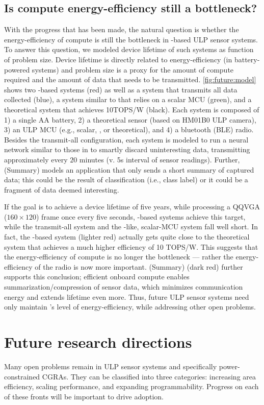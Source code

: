 \subsection{Is compute energy-efficiency still a bottleneck?}
With the progress that has been made, the natural question is whether the energy-efficiency of compute is still the bottleneck in \riptide-based ULP sensor systems.
% 
To answer this question, we modeled device lifetime of such systems as function of problem size.
%
Device lifetime is directly related to energy-efficiency (in battery-powered systems) and problem size is a proxy for the amount of compute required and the amount of data that needs to be transmitted.
% 
\autoref{fig:future:model} shows two \riptide-based systems (red) as well as a system that transmits all data collected (blue), a system similar to \sonic that relies on a scalar MCU (green), and a theoretical system that achieves 10TOPS/W (black).
% 
Each system is composed of 1) a single AA battery, 2) a theoretical sensor (based on HM01B0 ULP camera), 3) an ULP MCU (e.g., scalar, \riptide, or theoretical), and 4) a bluetooth (BLE) radio.
% 
Besides the transmit-all configuration, each system is modeled to run a neural network similar to those in \sonic to smartly discard uninteresting data, transmitting approximately every $20$ minutes (v. 5s interval of sensor readings).
% 
Further, \riptide (Summary) models an application that only sends a short summary of captured data; this could be the result of classification (i.e., class label) or it could be a fragment of data deemed interesting.

If the goal is to achieve a device lifetime of five years, while processing a QQVGA ($160\times120$) frame once every five seconds, \riptide-based systems achieve this target, while the transmit-all system and the \sonic-like, scalar-MCU system fall well short.
% 
In fact, the \riptide-based system (lighter red) actually gets quite close to the theoretical system that achieves a much higher efficiency of 10 TOPS/W.
% 
This suggests that the energy-efficiency of compute is no longer the bottleneck --- rather the energy-efficiency of the radio is now more important.
% 
\riptide (Summary) (dark red) further supports this conclusion; efficient onboard compute enables summarization/compression of sensor data, which minimizes communication energy and extends lifetime even more. 
% 
Thus, future ULP sensor systems need only maintain \riptide's level of energy-efficiency, while addressing other open problems.

\section{Future research directions}
Many open problems remain in ULP sensor systems and specifically power-constrained CGRAs.
% 
They can be classified into three categories: increasing area efficiency, scaling performance, and expanding programmability.
% 
Progress on each of these fronts will be important to drive adoption.

